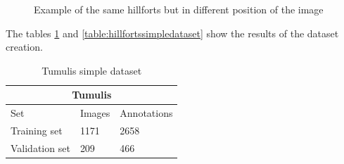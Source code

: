 \begin{figure}[H]
    \centering
    \qquad
    \caption{Example of the same hillforts but in different position of the image}%
    \label{Example of the same hillforts but in different position of the image}
\end{figure}

The tables \ref{table:tumulissimpledataset} and \ref{table:hillfortssimpledataset} show the results of the dataset creation.

\begin{table}[H]
\centering
\begin{tabular}{|p{3cm}|p{2.5cm}|p{2cm}|} 
\hline
\multicolumn{3}{|c|}{Tumulis} \\
 \hline
  Set & Images & Annotations\\ [0.5ex] 
 \hline
 Training set & 1171 & 2658 \\ 
 Validation set & 209 & 466  \\[1ex]
 \hline
\end{tabular}
\caption{Tumulis simple dataset}
\label{table:tumulissimpledataset}
\end{table} 


